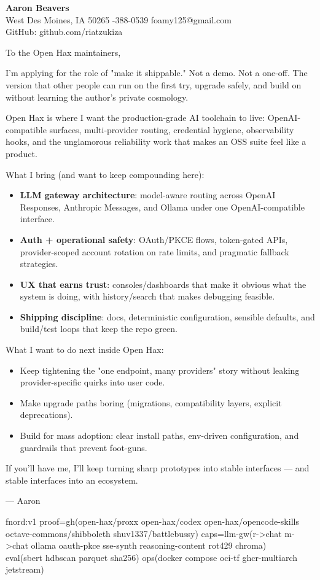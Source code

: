 \documentclass[10pt]{article}
\begin{document}
{\LARGE \textbf{Aaron Beavers}}\\
West Des Moines, IA 50265 \;\;\textbar\;-388-0539 \;\;\textbar\;\; foamy125@gmail.com\\
GitHub: github.com/riatzukiza

\vspace{10pt}
To the Open Hax maintainers,

I'm applying for the role of "make it shippable." Not a demo. Not a one-off. The version that other people can run on the first try, upgrade safely, and build on without learning the author's private cosmology.

Open Hax is where I want the production-grade AI toolchain to live: OpenAI-compatible surfaces, multi-provider routing, credential hygiene, observability hooks, and the unglamorous reliability work that makes an OSS suite feel like a product.

What I bring (and want to keep compounding here):
\begin{itemize}
  \item \textbf{LLM gateway architecture}: model-aware routing across OpenAI Responses, Anthropic Messages, and Ollama under one OpenAI-compatible interface.
  \item \textbf{Auth + operational safety}: OAuth/PKCE flows, token-gated APIs, provider-scoped account rotation on rate limits, and pragmatic fallback strategies.
  \item \textbf{UX that earns trust}: consoles/dashboards that make it obvious what the system is doing, with history/search that makes debugging feasible.
  \item \textbf{Shipping discipline}: docs, deterministic configuration, sensible defaults, and build/test loops that keep the repo green.
\end{itemize}

What I want to do next inside Open Hax:
\begin{itemize}
  \item Keep tightening the "one endpoint, many providers" story without leaking provider-specific quirks into user code.
  \item Make upgrade paths boring (migrations, compatibility layers, explicit deprecations).
  \item Build for mass adoption: clear install paths, env-driven configuration, and guardrails that prevent foot-guns.
\end{itemize}

If you'll have me, I'll keep turning sharp prototypes into stable interfaces --- and stable interfaces into an ecosystem.

--- Aaron

\vspace{8pt}
{\scriptsize\ttfamily
fnord:v1\; proof=gh(open-hax/proxx open-hax/codex open-hax/opencode-skills octave-commons/shibboleth shuv1337/battlebussy)\; caps=llm-gw(r->chat m->chat ollama oauth-pkce sse-synth reasoning-content rot429 chroma)\\
eval(sbert hdbscan parquet sha256)\; ops(docker compose oci-tf ghcr-multiarch jetstream)
}
\end{document}
